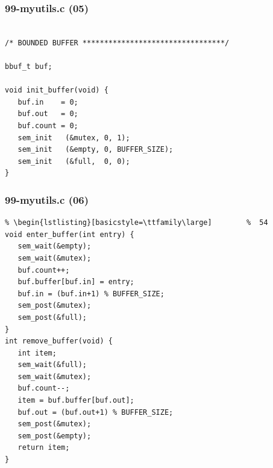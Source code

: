 \documentclass[aspectratio=169, xcolor=table, notheorems, hyperref={pdfpagelabels=false}]{beamer}
\begin{document}
\begin{frame}[fragile]
\frametitle{99-myutils.c (05)}
\begin{lstlisting}[basicstyle=\ttfamily\large]        %  54

/* BOUNDED BUFFER *********************************/

bbuf_t buf;

void init_buffer(void) {
   buf.in    = 0;
   buf.out   = 0;
   buf.count = 0;
   sem_init   (&mutex, 0, 1);
   sem_init   (&empty, 0, BUFFER_SIZE);
   sem_init   (&full,  0, 0);
}

\end{lstlisting}
\end{frame}

\begin{frame}[fragile]
\frametitle{99-myutils.c (06)}
\begin{lstlisting}[basicstyle=\ttfamily\footnotesize] %  72
% \begin{lstlisting}[basicstyle=\ttfamily\small]        %  65
% \begin{lstlisting}[basicstyle=\ttfamily\large]        %  54
void enter_buffer(int entry) {
   sem_wait(&empty);
   sem_wait(&mutex);
   buf.count++;
   buf.buffer[buf.in] = entry;
   buf.in = (buf.in+1) % BUFFER_SIZE;
   sem_post(&mutex);
   sem_post(&full);
}
int remove_buffer(void) {
   int item;
   sem_wait(&full);
   sem_wait(&mutex);
   buf.count--;
   item = buf.buffer[buf.out];
   buf.out = (buf.out+1) % BUFFER_SIZE;
   sem_post(&mutex);
   sem_post(&empty);
   return item;
}

\end{lstlisting}
\end{frame}
\end{document}
